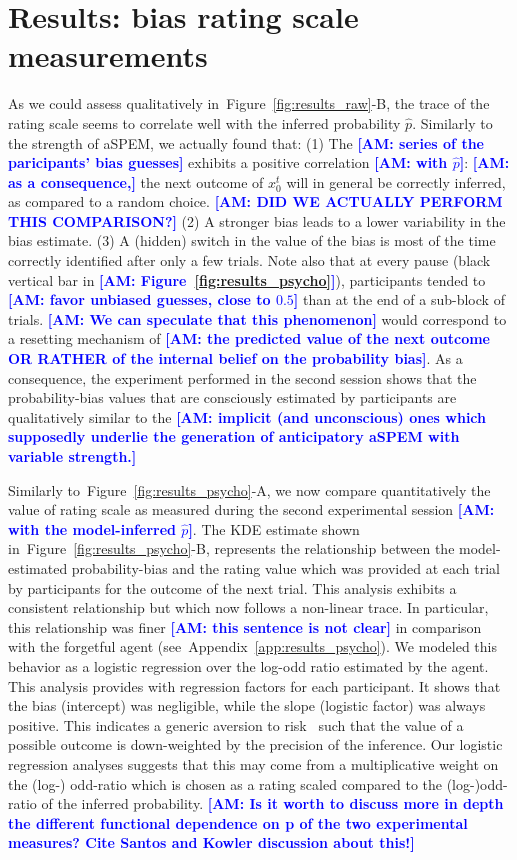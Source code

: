 \documentclass[12pt,english]{article}%
\newcommand{\citep}[1]{\parencite{#1}}
\newcommand{\seeFig}[1]{Figure~\ref{fig:#1}}
\newcommand{\seeApp}[1]{Appendix~\ref{app:#1}}
\newcommand{\AM}[1]{\textbf{\textcolor{blue}{[AM: #1]}}}
\begin{document}
\section{Results: bias rating scale measurements}
\label{sec:rating_scale}
As we could assess qualitatively in~\seeFig{results_raw}-B,
the trace of the rating scale seems to correlate well
with the inferred probability $\hat{p}$.
Similarly to the strength of aSPEM, we actually found that:
(1) The \AM{series of the paricipants' bias guesses} exhibits a positive correlation \AM{with $\hat{p}$}:
\AM{as a consequence,} the next outcome of $x_{0}^{t}$ will in general be correctly inferred,
as compared to a random choice. \AM{DID WE ACTUALLY PERFORM THIS COMPARISON?}
(2) A stronger bias leads to a lower variability in the bias estimate.
(3) A (hidden) switch in the value of the bias is
most of the time correctly identified after only a few trials.
Note also that at every pause (black vertical bar in \AM{\seeFig{results_psycho}}),
participants tended to \AM{favor unbiased guesses, close to $0.5$}
than at the end of a sub-block of trials.
\AM{We can speculate that this phenomenon} would correspond to a resetting mechanism
of \AM{the predicted value of the next outcome OR RATHER of the internal belief on the probability bias}.
As a consequence, the experiment performed in the second session
shows that the probability-bias values that are consciously estimated by participants
are qualitatively similar to the \AM{implicit (and unconscious) ones which supposedly underlie the generation of anticipatory aSPEM with variable strength.}

Similarly to~\seeFig{results_psycho}-A,
we now compare quantitatively the value of rating scale
as measured during the second experimental session \AM{with the model-inferred $\hat{p}$}.
The KDE estimate shown in~\seeFig{results_psycho}-B,
represents the relationship between
the model-estimated probability-bias
and the rating value which was provided at each trial
by participants for the outcome of the next trial.
This analysis exhibits a consistent relationship
but which now follows a non-linear trace.
In particular, this relationship was finer \AM{this sentence is not clear}
in comparison with
the forgetful agent (see~\seeApp{results_psycho}).
We modeled this behavior as
a logistic regression over
the log-odd ratio estimated by the agent.
This analysis provides with regression factors for each participant.
It shows that the bias (intercept)
was negligible, while the slope (logistic factor)
was always positive.
This indicates a generic aversion to risk~\citep{Kahneman13}
such that the value of a possible outcome
is down-weighted by the precision of the inference.
Our logistic regression analyses
suggests that this may come from a multiplicative weight
on the (log-) odd-ratio which is chosen as a rating scaled
compared to the (log-)odd-ratio of the inferred probability. \AM{Is it worth to discuss more in depth the different functional dependence on p of the two experimental measures? Cite Santos and Kowler discussion about this!}
\end{document}
